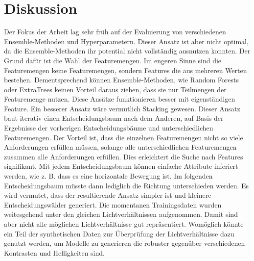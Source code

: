 \chapter{Diskussion}
Der Fokus der Arbeit lag sehr früh auf der Evaluierung von verschiedenen Ensemble-Methoden und Hyperparametern. Dieser Ansatz ist aber nicht optimal, da die Ensemble-Methoden ihr potential nicht vollständig
ausnutzen konnten. Der Grund dafür ist die Wahl der Featuremengen. Im engeren Sinne sind die Featuremengen keine Featuremengen, sondern Features die aus mehreren Werten bestehen. Dementsprechend können
Ensemble-Methoden, wie Random Forests oder ExtraTrees keinen Vorteil daraus ziehen, dass sie nur Teilmengen der Featuremenge nutzen. Diese Ansätze funktionieren besser mit eigenständigen Feature.
\newline
\newline
Ein besserer Ansatz wäre vermutlich Stacking gewesen. Dieser Ansatz baut iterativ einen Entscheidungsbaum nach dem Anderen, auf Basis der Ergebnisse der vorherigen Entscheidungsbäume und
unterschiedlichen Featuremengen. Der Vorteil ist, dass die einzelnen Featuremengen nicht so viele Anforderungen erfüllen müssen, solange alle unterschiedlichen Featuremengen zusammen alle
Anforderungen erfüllen. Dies erleichtert die Suche nach Features signifikant. Mit jedem Entscheidungsbaum können einfache Attribute inferiert werden, wie z. B. dass es eine horizontale Bewegung ist.
Im folgenden Entscheidungsbaum müsste dann lediglich die Richtung unterschieden werden. Es wird vermutet, dass der resultierende Ansatz simpler ist und kleinere Entscheidungswälder generiert.
\newline
\newline
Die momentanen Trainingsdaten wurden weitesgehend unter den gleichen Lichtverhältnissen aufgenommen. Damit sind aber nicht alle möglichen Lichtverhältnisse gut repräsentiert. Womöglich könnte ein
Teil der synthetischen Daten zur Überprüfung der Lichtverhältnisse dazu genutzt werden, um Modelle zu generieren die robuster gegenüber verschiedenen Kontrasten und Helligkeiten sind.